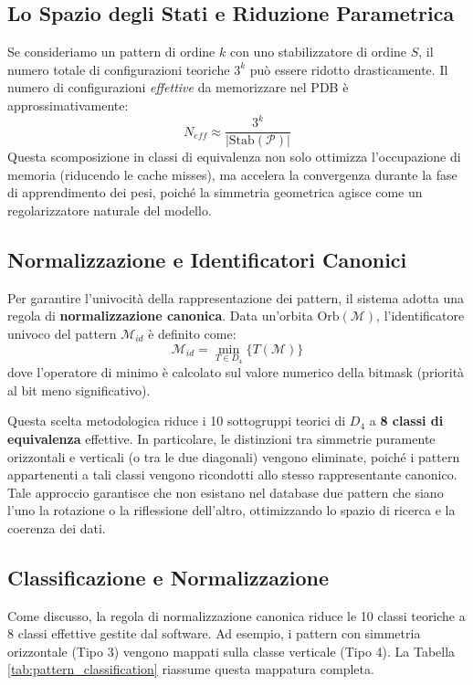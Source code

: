 \subsection{Lo Spazio degli Stati e Riduzione Parametrica}
Se consideriamo un pattern di ordine $k$ con uno stabilizzatore di ordine $S$, il numero totale di configurazioni teoriche $3^k$ può essere ridotto drasticamente. Il numero di configurazioni \textit{effettive} da memorizzare nel PDB è approssimativamente:
\begin{equation}
    N_{eff} \approx \frac{3^k}{|\text{Stab}(\mathcal{P})|}
\end{equation}
Questa scomposizione in classi di equivalenza non solo ottimizza l'occupazione di memoria (riducendo le cache misses), ma accelera la convergenza durante la fase di apprendimento dei pesi, poiché la simmetria geometrica agisce come un regolarizzatore naturale del modello.

\subsection{Normalizzazione e Identificatori Canonici}
Per garantire l'univocità della rappresentazione dei pattern, il sistema adotta una regola di \textbf{normalizzazione canonica}. Data un'orbita $\text{Orb}(\mathcal{M})$, l'identificatore univoco del pattern $\mathcal{M}_{id}$ è definito come:
\begin{equation}
    \mathcal{M}_{id} = \min_{T \in D_4} \{ T(\mathcal{M}) \}
\end{equation}
dove l'operatore di minimo è calcolato sul valore numerico della bitmask (priorità al bit meno significativo).

Questa scelta metodologica riduce i 10 sottogruppi teorici di $D_4$ a \textbf{8 classi di equivalenza} effettive. In particolare, le distinzioni tra simmetrie puramente orizzontali e verticali (o tra le due diagonali) vengono eliminate, poiché i pattern appartenenti a tali classi vengono ricondotti allo stesso rappresentante canonico. Tale approccio garantisce che non esistano nel database due pattern che siano l'uno la rotazione o la riflessione dell'altro, ottimizzando lo spazio di ricerca e la coerenza dei dati.
\subsection{Classificazione e Normalizzazione}

Come discusso, la regola di normalizzazione canonica riduce le 10 classi teoriche a 8 classi effettive gestite dal software. Ad esempio, i pattern con simmetria orizzontale (Tipo 3) vengono mappati sulla classe verticale (Tipo 4). La Tabella \ref{tab:pattern_classification} riassume questa mappatura completa.

